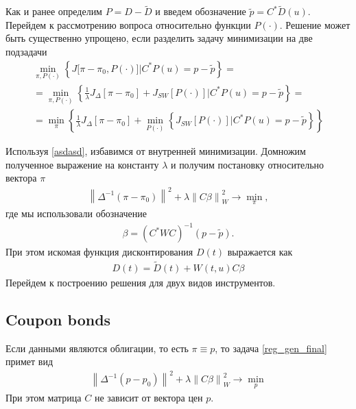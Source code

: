 \documentclass[10pt]{article}
\theoremstyle{definition}
\theoremstyle{remark}
\theoremstyle{plain}
\newcommand{\wt}{\widetilde}
\begin{document}
Как и ранее определим $P = D - \wt{D}$ и введем обозначение $\tilde{p} = C^*\wt{D}(u)$. Перейдем к рассмотрению вопроса относительно функции $P(\cdot)$. Решение может быть существенно упрощено, если разделить задачу минимизации на две подзадачи
\begin{multline*}
\min\limits_{\pi,P(\cdot)}
\left\{
	J\bigl[\pi-\pi_0,P(\cdot)\bigr]
	\Big|
	C^*P(u) = p - \tilde{p}
\right\} =
\\
= \min\limits_{\pi,P(\cdot)}
\left\{
	\frac{1}{\lambda} J_{\Delta} [\pi - \pi_0] + J_{SW}\left[P(\cdot)\right]
	\Big|
	C^*P(u) = p - \tilde{p} 
\right\}= 
\\
= \min\limits_{\pi} 
\left\{
	\frac{1}{\lambda} J_{\Delta} [\pi - \pi_0] + 
	\min\limits_{P(\cdot)} 
	\left\{
		J_{SW}\left[P(\cdot)\right]
		\Big|
		C^*P(u) = p - \tilde{p} 
	\right\}
\right\}
\end{multline*}

Используя \eqref{asdasd}, избавимся от внутренней минимизации. Домножим полученное выражение на константу $\lambda$ и получим постановку относительно вектора $\pi$
\begin{align}
\left\| \Delta^{-1}\left(\pi - \pi_0\right)\right\|^2 +
\lambda
\left\|C\beta\right\|^2_W 
\rightarrow \min\limits_\pi , \label{reg_gen_final}
\end{align}
где мы использовали обозначение
\begin{align}
\beta = \left(C^*WC\right)^{-1}(p-\tilde{p}). \label{beta_def}
\end{align}
При этом искомая функция дисконтирования $D(t)$ выражается как
\begin{align}
D(t) = \wt{D}(t) + W(t,u)C\beta
\end{align}
Перейдем к построению решения для двух видов инструментов.



\subsection{Coupon bonds}

Если данными являются облигации, то есть $\pi \equiv p$, то задача \eqref{reg_gen_final} примет вид
\begin{align}
\left\| \Delta^{-1}\left(p - p_0\right)\right\|^2 +
\lambda
\left\|C\beta\right\|^2_W 
\rightarrow \min\limits_p \label{reg_bond_min_p}
\end{align}
При этом матрица $C$ не зависит от вектора цен $p$.
\end{document}
